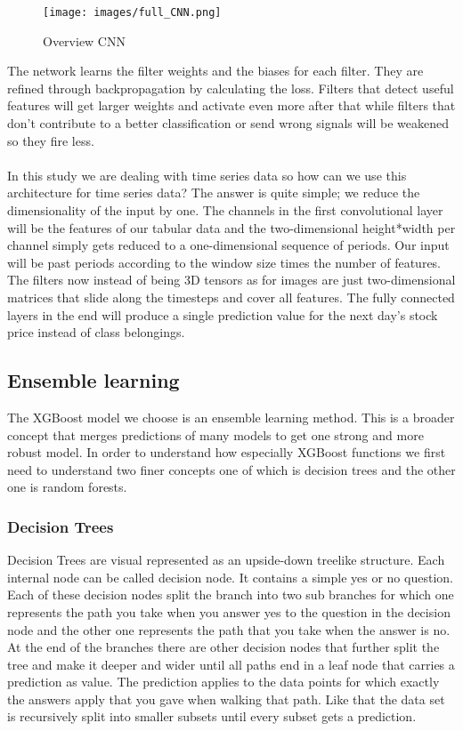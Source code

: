 \documentclass[a4paper,12pt]{report}
\begin{document}
\begin{figure}[htbp]
  \centering
  \texttt{[image: images/full\_CNN.png]}
  \caption{Overview CNN}
  \label{fig:fullwidth}
\end{figure}
	
	The network learns the filter weights and the biases for each filter. They are refined through backpropagation by calculating the loss. Filters that detect useful features will get larger weights and activate even more after that while filters that don’t contribute to a better classification or send wrong signals will be weakened so they fire less.\\\\
	In this study we are dealing with time series data so how can we use this architecture for time series data? The answer is quite simple; we reduce the dimensionality of the input by one. The channels in the first convolutional layer will be the features of our tabular data and the two-dimensional height*width per channel simply gets reduced to a one-dimensional sequence of periods. Our input will be past periods according to the window size times the number of features. The filters now instead of being 3D tensors as for images are just two-dimensional matrices that slide along the timesteps and cover all features. The fully connected layers in the end will produce a single prediction value for the next day’s stock price instead of class belongings.
	
	
	
	\subsection{Ensemble learning}
	The XGBoost model we choose is an ensemble learning method. This is a broader concept that merges predictions of many models to get one strong and more robust model. In order to understand how especially XGBoost functions we first need to understand two finer concepts one of which is decision trees and the other one is random forests.
	
	\subsubsection{Decision Trees}
	
	Decision Trees are visual represented as an upside-down treelike structure. Each internal node can be called decision node. It contains a simple yes or no question. Each of these decision nodes split the branch into two sub branches for which one represents the path you take when you answer yes to the question in the decision node and the other one represents the path that you take when the answer is no. At the end of the branches there are other decision nodes that further split the tree and make it deeper and wider until all paths end in a leaf node that carries a prediction as value. The prediction applies to the data points for which exactly the answers apply that you gave when walking that path. Like that the data set is recursively split into smaller subsets until every subset gets a prediction.
	
\end{document}
